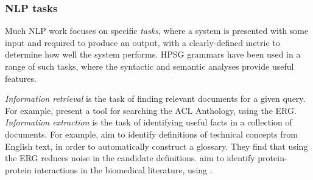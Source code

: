 \documentclass[output=paper
                ,modfonts
                ,nonflat
	        ,collection
	        ,collectionchapter
	        ,collectiontoclongg
 	        ,biblatex
                ,babelshorthands
                ,newtxmath
                ,draftmode
                ,colorlinks, citecolor=brown
]{./langsci/langscibook}
\begin{document}
\subsubsection{NLP tasks}
\label{cl:downstream:nlp}


Much NLP work focuses on specific \textit{tasks},
where a system is presented with some input
and required to produce an output,
with a clearly-defined metric to determine how well the system performs.
HPSG grammars have been used in a range of such tasks,
where the syntactic and semantic analyses provide useful features.

\textit{Information retrieval}
is the task of finding relevant documents for a given query.
For example, \citet{schaefer2011acl} present a tool for searching the ACL Anthology, using the ERG.
\textit{Information extraction}
is the task of identifying useful facts in a collection of documents.
For example, \citet{reiplinger2012glossary} aim to identify definitions of technical concepts from English text,
in order to automatically construct a glossary.
They find that using the ERG reduces noise in the candidate definitions.
\citet{miyao2008protein} aim to identify protein-protein interactions in the  biomedical literature, using .
\end{document}
